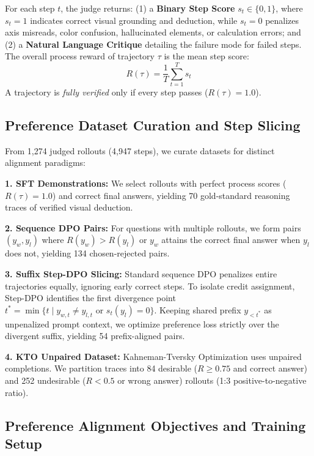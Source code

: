 \documentclass[11pt]{article}
\begin{document}
For each step $t$, the judge returns: (1) a \textbf{Binary Step Score} $s_t \in \{0, 1\}$, where $s_t = 1$ indicates correct visual grounding and deduction, while $s_t = 0$ penalizes axis misreads, color confusion, hallucinated elements, or calculation errors; and (2) a \textbf{Natural Language Critique} detailing the failure mode for failed steps. The overall process reward of trajectory $\tau$ is the mean step score:
\begin{equation}
    R(\tau) = \frac{1}{T} \sum_{t=1}^T s_t
    \label{eq:process_reward}
\end{equation}
A trajectory is \textit{fully verified} only if every step passes ($R(\tau) = 1.0$).


\subsection{Preference Dataset Curation and Step Slicing}
\label{subsec:dataset_curation}
From 1,274 judged rollouts (4,947 steps), we curate datasets for distinct alignment paradigms:

\textbf{1. SFT Demonstrations:} We select rollouts with perfect process scores ($R(\tau) = 1.0$) and correct final answers, yielding 70 gold-standard reasoning traces of verified visual deduction.

\textbf{2. Sequence DPO Pairs:} For questions with multiple rollouts, we form pairs $(y_w, y_l)$ where $R(y_w) > R(y_l)$ or $y_w$ attains the correct final answer when $y_l$ does not, yielding 134 chosen-rejected pairs.

\textbf{3. Suffix Step-DPO Slicing:} Standard sequence DPO penalizes entire trajectories equally, ignoring early correct steps. To isolate credit assignment, Step-DPO identifies the first divergence point $t^* = \min \{ t \mid y_{w,t} \neq y_{l,t} \text{ or } s_t(y_l) = 0 \}$. Keeping shared prefix $y_{<t^*}$ as unpenalized prompt context, we optimize preference loss strictly over the divergent suffix, yielding 54 prefix-aligned pairs.

\textbf{4. KTO Unpaired Dataset:} Kahneman-Tversky Optimization uses unpaired completions. We partition traces into 84 desirable ($R \ge 0.75$ and correct answer) and 252 undesirable ($R < 0.5$ or wrong answer) rollouts (1:3 positive-to-negative ratio).

\subsection{Preference Alignment Objectives and Training Setup}
\label{subsec:alignment_objectives}
\end{document}
